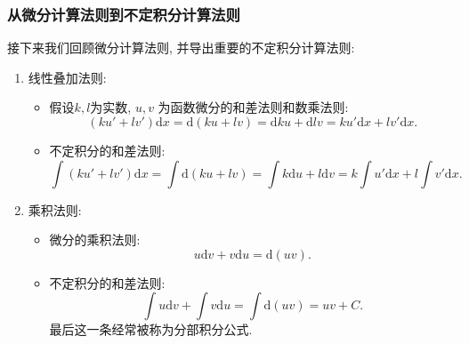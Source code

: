 \documentclass[
10pt,
aspectratio=43,
]{beamer}
\begin{document}
\begin{frame}
	\frametitle{从微分计算法则到不定积分计算法则}
	接下来我们回顾微分计算法则, 并导出重要的不定积分计算法则:\pause
	\begin{block}{}
		\begin{enumerate}
			\item 线性叠加法则:
			      \begin{itemize}
				      \item \pause 假设$k, l$为实数, $u, v$ 为函数微分的和差法则和数乘法则:
				            $$
					            (ku'+lv')\mathrm{d}x=\mathrm{d}(ku+ lv) = \mathrm{d}ku + \mathrm{d}lv=ku'\mathrm{d}x+lv'\mathrm{d}x.
				            $$
				      \item \pause 不定积分的和差法则:
				            $$
					            \int(ku'+lv')\mathrm{d}x=\int\mathrm{d}(ku+ lv) = \int k\mathrm{d}u + l\mathrm{d}v=k\int u'\mathrm{d}x+l\int v'\mathrm{d}x.
				            $$
			      \end{itemize}
			      \pause
			\item 乘积法则:
			      \begin{itemize}
				      \item \pause 微分的乘积法则:
				            $$
					            u\mathrm{d}v+v\mathrm{d}u =\mathrm{d}(uv).
				            $$
				      \item \pause 不定积分的和差法则:
				            $$
					            \int u\mathrm{d}v+\int v\mathrm{d}u=\int\mathrm{d}(uv) = uv + C.
				            $$
				            \pause 最后这一条经常被称为分部积分公式.
			      \end{itemize}
		\end{enumerate}
	\end{block}
\end{frame}
\end{document}
